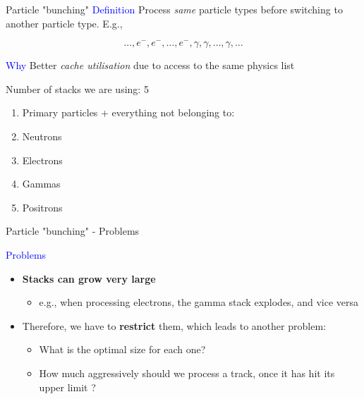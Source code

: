 \documentclass{beamer}
\begin{document}
\begin{frame}{Particle "bunching"}
\textcolor{blue}{Definition}
Process \textit{same} particle types before switching to another particle type. E.g.,

\begin{equation*}
\ldots, e^-, e^-, \ldots, e^-, \gamma, \gamma, \ldots, \gamma, \ldots
\end{equation*}

\textcolor{blue}{Why} Better \textit{cache utilisation} due to access to the
same physics list

\vspace{5 mm}

Number of stacks we are using: 5

\begin{enumerate}
\item Primary particles + everything not belonging to:
\item Neutrons
\item Electrons
\item Gammas
\item Positrons
\end{enumerate}
\end{frame}

\begin{frame}{Particle "bunching" - Problems}

\textcolor{blue}{Problems}
\begin{itemize}
\item {\bf Stacks can grow very large}
\begin{itemize}
\item e.g., when processing electrons, the gamma stack explodes, and vice versa
\end{itemize}
\item Therefore, we have to {\bf restrict} them, which leads to another problem:
\begin{itemize}
\item What is the optimal size for each one?
\item How much aggressively should we process a track, once it has hit its upper limit ?
\end{itemize}
\end{itemize}
\end{frame}
\end{document}
